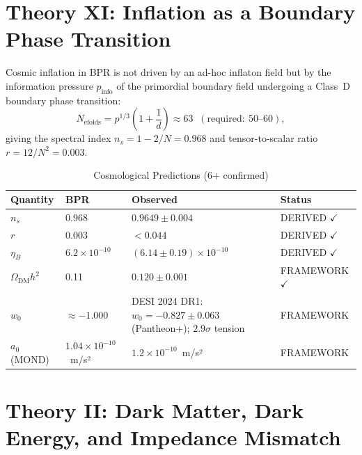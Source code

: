 \documentclass[12pt,oneside]{book}
\theoremstyle{definition}
\newcommand{\pinfo}{p_{\mathrm{info}}}
\begin{document}
\section{Theory XI: Inflation as a Boundary Phase Transition}

Cosmic inflation in BPR is not driven by an ad-hoc inflaton field but by the
information pressure $\pinfo$ of the primordial boundary field undergoing a
Class~D boundary phase transition:
\begin{equation}
  N_{\mathrm{efolds}} = p^{1/3}\!\left(1 + \frac{1}{d}\right) \approx 63
  \;\;(\mathrm{required:}~50\text{--}60),
\end{equation}
giving the spectral index $n_s = 1 - 2/N = 0.968$ and tensor-to-scalar
ratio $r = 12/N^2 = 0.003$.

\begin{longtable}{@{}llll@{}}
  \caption{Cosmological Predictions (6+ confirmed)}\\
  \toprule\textbf{Quantity} & \textbf{BPR} & \textbf{Observed} & \textbf{Status}\\
  \midrule\endfirsthead\midrule\endhead
  $n_s$ & 0.968 & $0.9649\pm0.004$ & DERIVED $\checkmark$\\
  $r$ & 0.003 & $< 0.044$ & DERIVED $\checkmark$\\
  $\eta_B$ & $6.2\times10^{-10}$ & $(6.14\pm0.19)\times10^{-10}$ & DERIVED $\checkmark$\\
  $\Omega_{\mathrm{DM}}h^2$ & 0.11 & $0.120\pm0.001$ & FRAMEWORK $\checkmark$\\
  $w_0$ & $\approx -1.000$ & DESI 2024 DR1: $w_0=-0.827\pm0.063$ (Pantheon+); $2.9\sigma$ tension & FRAMEWORK\\
  $a_0$ (MOND) & $1.04\times10^{-10}$~m/s² & $1.2\times10^{-10}$~m/s² & FRAMEWORK\\
  \bottomrule
\end{longtable}

\section{Theory II: Dark Matter, Dark Energy, and Impedance Mismatch}
\end{document}
